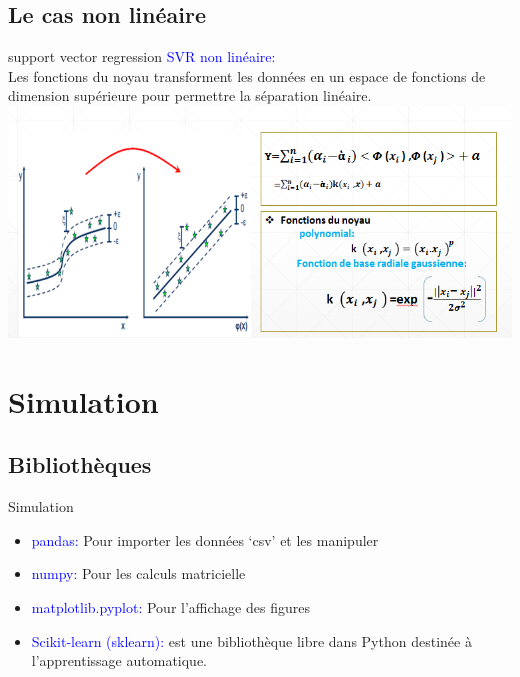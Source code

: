 \documentclass{bredelebeamer}
\begin{document}
 \subsection{Le cas non linéaire}
   \begin{frame}{support vector regression}
     \textcolor{blue}{SVR non linéaire:}\vspace{1\baselineskip}\\
Les fonctions du noyau transforment les données en un espace de fonctions de dimension supérieure pour permettre la séparation linéaire.
     \includegraphics[scale=0.54]{26.png}

 \end{frame}
 
 \section{Simulation}
  \subsection{Bibliothèques}
     \begin{frame}{Simulation}
     \begin{itemize}
        \item \textcolor{blue}{pandas:} Pour importer les données ‘csv’ et les manipuler \vspace{1\baselineskip}\\
         \item \textcolor{blue}{numpy:} Pour les calculs matricielle \vspace{1\baselineskip}\\
           \item  \textcolor{blue}{matplotlib.pyplot:}  Pour l’affichage des figures\vspace{1\baselineskip}\\
            \item  \textcolor{blue}{Scikit-learn (sklearn):}  est une bibliothèque libre dans Python destinée à l'apprentissage automatique.\vspace{1\baselineskip}\\
   \end{itemize}
     \end{frame} 
\end{document}
